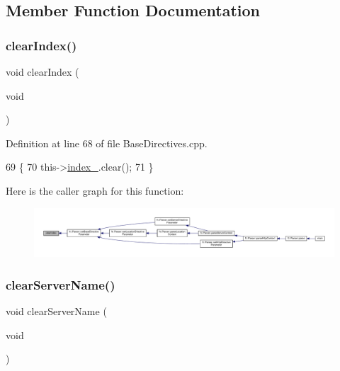 \subsection{Member Function Documentation}
\mbox{\label{classft_1_1_base_directives_a36d96dc74e650162c25a325813130ab2}} 
\subsubsection{\texorpdfstring{clear\+Index()}{clearIndex()}}
{\footnotesize\ttfamily void clear\+Index (\begin{DoxyParamCaption}\item[{void}]{ }\end{DoxyParamCaption})\hspace{0.3cm}{\ttfamily [inherited]}}



Definition at line 68 of file Base\+Directives.\+cpp.


\begin{DoxyCode}
69     \{
70         this->\hyperlink{classft_1_1_base_directives_a6ba30626837f300201cd32c35d50aa49}{index\_}.clear();
71     \}
\end{DoxyCode}
Here is the caller graph for this function\+:
\nopagebreak
\begin{figure}[H]
\begin{center}
\leavevmode
\includegraphics[width=350pt]{classft_1_1_base_directives_a36d96dc74e650162c25a325813130ab2_icgraph}
\end{center}
\end{figure}
\mbox{\label{classft_1_1_server_block_aaf4aa7d96124b157e91274eb88c77808}} 
\subsubsection{\texorpdfstring{clear\+Server\+Name()}{clearServerName()}}
{\footnotesize\ttfamily void clear\+Server\+Name (\begin{DoxyParamCaption}\item[{void}]{ }\end{DoxyParamCaption})}



